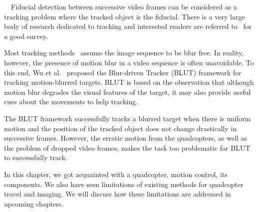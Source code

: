 
~~Fiducial detection between successive video
frames can be considered as a tracking problem where the tracked
object is the fiducial.  There is a very large body of research
dedicated to tracking and interested readers are referred
to~\cite{Yilmaz:2006} for a good survey.

Most tracking methods~\cite{Ross:2008,Wu:2009,Perez02,Mei:2009} assume
the image sequence to be blur free. In reality, however, the presence
of motion blur in a video sequence is often unavoidable. To this end,
Wu et al.~\cite{Wu:2011} proposed the Blur-driven Tracker (BLUT)
framework for tracking motion-blurred targets. BLUT is based on the
observation that although motion blur degrades the visual features of
the target, it may also provide useful cues about the movements to help
tracking.

The BLUT framework successfully tracks a blurred target when there is
uniform motion and the position of the tracked object does not change
drastically in successive frames. However, the erratic motion from the
quadcopters, as well as the problem of dropped video frames, makes the task too
problematic for BLUT to successfully track.

In this chapter, we got acquainted with a quadcopter, motion control, its
components. We also have seen limitations of existing methods for quadcopter
travel and imaging.  We will discuss how these limitations are addressed in
upcoming chapters.
